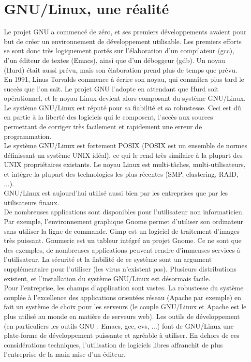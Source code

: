 \documentclass{article}
\begin{document}
\section{GNU/Linux, une réalité} 
Le projet GNU a commencé de zéro, et ses premiers développements avaient pour but de créer un environnement de développement utilisable. Les premiers efforts se sont donc très logiquement portés sur l'élaboration d'un compilateur (gcc), d'un éditeur de textes (Emacs), ainsi que d'un déboggeur (gdb). Un noyau (Hurd) était aussi prévu, mais son élaboration prend plus de temps que prévu. \vspace{5mm} \\
En 1991, Linus Torvalds commence à écrire son noyau, qui connaîtra plus tard le succès que l'on sait. Le projet GNU l'adopte en attendant que Hurd soit opérationnel, et le noyau Linux devient alors composant du système GNU/Linux. \vspace{5mm} \\
Le système GNU/Linux est réputé pour sa fiabilité et sa robustesse. Ceci est dû en partie à la liberté des logiciels qui le composent, l'accès aux sources permettant de corriger très facilement et rapidement une erreur de programmation. \vspace{5mm} \\
Le système GNU/Linux est fortement POSIX (POSIX est un ensemble de normes définissant un système UNIX idéal), ce qui le rend très similaire à la plupart des UNIX propriétaires existants. Le noyau Linux est multi-tâches, multi-utilisateurs, et intègre la plupart des technologies les plus récentes (SMP, clustering, RAID, ...). \vspace{5mm} \\
GNU/Linux est aujourd'hui utilisé aussi bien par les entreprises que par les utilisateurs finaux. \vspace{5mm} \\
De nombreuses applications sont disponibles pour l'utilisateur non informaticien. Par exemple, l'environnement graphique Gnome permet d'utiliser son ordinateur sans utiliser la ligne de commande. Gimp est un logiciel de traitement d'images très puissant. Gnumeric est un tableur intégré au projet Gnome. Ce ne sont que des exemples, de nombreuses applications peuvent rendre d'immenses services à l'utilisateur. La sécurité et la fiabilité de ce système sont un argument supplémentaire pour l'utiliser (les virus n'existent pas). Plusieurs distributions existent, et l'installation du système GNU/Linux est désormais facile. \vspace{5mm} \\
Pour l'entreprise, les champs d'application sont vastes. La robustesse du système couplée à l'excellence des applications orientées réseau (Apache par exemple) en fait un système de choix pour les serveurs (le couple GNU/Linux et Apache est le plus utilisé au monde en matière de serveurs web). Les outils de développement (en particuliers les outils GNU : Emacs, gcc, cvs, ...) font de GNU/Linux une plate-forme de développement puissante et agréable à utiliser. En dehors de ces considérations techniques, l'utilisation de logiciels libres affranchit de plus l'entreprise de la main-mise d'un éditeur.
\end{document}
